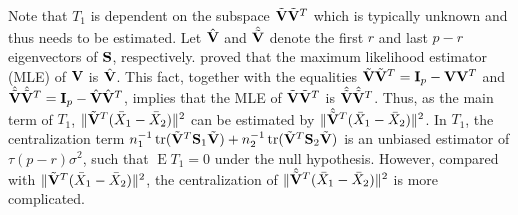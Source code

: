 \documentclass[3p]{elsarticle}
\DeclareMathOperator{\mytr}{tr}
\DeclareMathOperator{\myE}{E}
\theoremstyle{plain}
\theoremstyle{definition}
\newtheorem{remark}{\quad\quad Remark}
\theoremstyle{remark}
\begin{document}


Note that $T_1$ %
is dependent on the subspace $\tilde{\mathbf{V}}\tilde{\mathbf{V}}^T$ which is typically unknown and thus needs to be estimated.
Let $\hat{\mathbf{V}}$ and $\hat{\tilde{\mathbf{V}}}$ denote the first $r$ and last $p-r$ eigenvectors of $\mathbf{S}$, respectively.
\cite{Anderson1986Asymptotic} proved that the maximum likelihood estimator (MLE) of $\mathbf{V}$ is $\hat{\mathbf{V}}$.
This fact, together with the equalities $\tilde{\mathbf{V}}\tilde{\mathbf{V}}^T= \mathbf{I}_p-\mathbf{V}\mathbf{V}^T$ and $\hat{\tilde{\mathbf{V}}}\hat{\tilde{\mathbf{V}}}^T= \mathbf{I}_p-\hat{\mathbf{V}}\hat{\mathbf{V}}^T$, implies that 
the MLE of $\tilde{\mathbf{V}}\tilde{\mathbf{V}}^T$ is $\hat{\tilde{\mathbf{V}}}\hat{\tilde{\mathbf{V}}}^T$.
Thus, as the main term of $T_1$,
$\|\tilde{\mathbf{V}}^T (\bar{X}_1-\bar{X}_2)\|^2$ can be estimated by $\|\hat{\tilde{\mathbf{V}}}^T (\bar{X}_1-\bar{X}_2)\|^2$.
In $T_1$, the centralization term $n_1^{-1}\mytr(\tilde{\BV}^T \BS_1\tilde{\BV})+n_2^{-1}\mytr(\tilde{\BV}^T \BS_2\tilde{\BV})$ is an unbiased estimator of $\tau (p-r)\sigma^2$, such that $\myE T_1=0$ under the null hypothesis.
However, compared with $\|\tilde{\mathbf{V}}^T (\bar{X}_1-\bar{X}_2)\|^2$, the centralization of $\|\hat{\tilde{\mathbf{V}}}^T (\bar{X}_1-\bar{X}_2)\|^2$ is more complicated.
\end{document}
